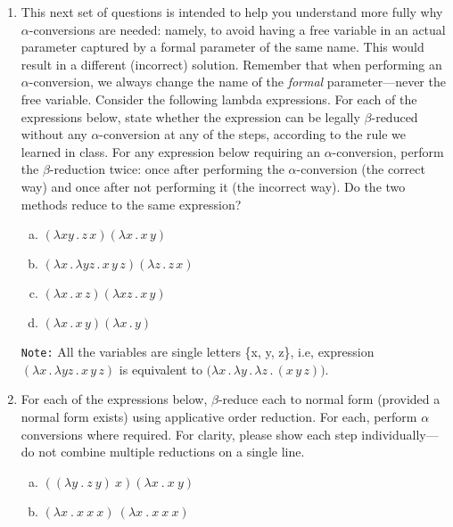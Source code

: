 \documentclass{exam}
\newcommand{\lam}[2]{\lambda {#1} \,.\, {#2}}
\begin{document}
\begin{questions}
\begin{enumerate}
\item This next set of questions is intended to help you understand more fully why $\alpha$-conversions are needed:
namely, to avoid having a free variable in an actual parameter captured by a formal parameter of the same name.  This 
would result in a different (incorrect) solution.
Remember that when performing an $\alpha$-conversion, we always change the name of the \emph{formal} parameter---never the free
variable.   Consider the following lambda expressions.
For each of the expressions below, state whether the expression can be legally $\beta$-reduced without
any $\alpha$-conversion at any of the steps, according to the rule we learned in class.  
For any expression below requiring an $\alpha$-conversion, perform the $\beta$-reduction twice: once after performing the
$\alpha$-conversion (the correct way) and once after not performing it (the incorrect way).
Do the two methods reduce to the same expression?

 \begin{enumerate}[a.]
 \item $(\lam{x y}{z\, x}) (\lam{x}{x\, y})$
 
 \item $(\lam{x} {\lam{yz} {x\, y\, z}}) (\lam{z} {z\, x})$
    
 \item $(\lam{x}{x\, z}) (\lam{xz}{x\, y})$
 
 \item $(\lam{x}{x\,y}) (\lam{x}{y})$
 \end{enumerate}
 
\verb|Note:| All the variables are single letters \{x, y, z\}, i.e, expression $(\lam{x} {\lam{yz} {x\, y\, z}})$ is equivalent to $(\lam{x} {\lam{y} {\lam{z} {(x\, y\, z)}})}$.



\item For each of the expressions below, $\beta$-reduce each to normal form (provided a normal form exists) using
applicative order reduction. 
For each, perform $\alpha$ conversions where required.
For clarity, please show each step individually---do not combine multiple reductions on a single line.

\begin{enumerate}[a.]

\item  $((\lambda y~ .~ z~ y)~ x) (\lambda x~ .~ x~ y)$

\item  $(\lambda x~ .~ x~ x~ x)~ (\lambda x~ .~ x~ x~ x)$


\end{enumerate}
\end{enumerate}
\end{questions}
\end{document}
